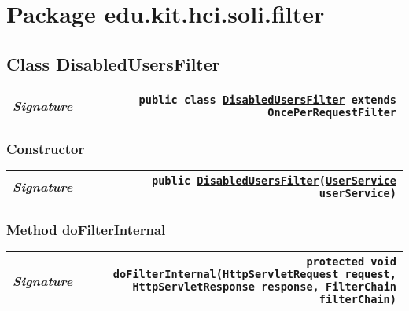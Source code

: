 

\section{Package edu.kit.hci.soli.filter}
\begin{adjustwidth}{1.5em}{0pt}
  \subsection{Class DisabledUsersFilter\label{edu.kit.hci.soli.filter.DisabledUsersFilter} }
  \begin{adjustwidth}{1.5em}{0pt}
    {\begin{tabularx}{1.0\linewidth}{@{}l R@{}}
      \emph{Signature} & \texttt{public  class \texttt{\hyperref[edu.kit.hci.soli.filter.DisabledUsersFilter]{\texttt{DisabledUsersFilter}} extends \texttt{OncePerRequestFilter}}} \\
      \hline
  
    \end{tabularx}}\subsubsection{Constructor\label{edu.kit.hci.soli.filter.DisabledUsersFilter@edu.kit.hci.soli.filter.DisabledUsersFilter(edu.kit.hci.soli.service.UserService)}}
    \begin{adjustwidth}{1.5em}{0pt}
      {\begin{tabularx}{1.0\linewidth}{@{}l R@{}}
        \emph{Signature} & \texttt{public \texttt{\hyperref[edu.kit.hci.soli.filter.DisabledUsersFilter]{\texttt{DisabledUsersFilter}}}(\texttt{\hyperref[edu.kit.hci.soli.service.UserService]{\texttt{UserService}}} userService)} \\
        \hline
  
      \end{tabularx}}
    \end{adjustwidth}\subsubsection{Method doFilterInternal\label{edu.kit.hci.soli.filter.DisabledUsersFilter@doFilterInternal(jakarta.servlet.http.HttpServletRequest,jakarta.servlet.http.HttpServletResponse,jakarta.servlet.FilterChain)}}
    \begin{adjustwidth}{1.5em}{0pt}
      {\begin{tabularx}{1.0\linewidth}{@{}l R@{}}
        \emph{Signature} & \texttt{protected \texttt{void} doFilterInternal(\texttt{HttpServletRequest} request, \texttt{HttpServletResponse} response, \texttt{FilterChain} filterChain)} \\
        \hline
  
      \end{tabularx}}
    \end{adjustwidth}
  \end{adjustwidth}
\end{adjustwidth}